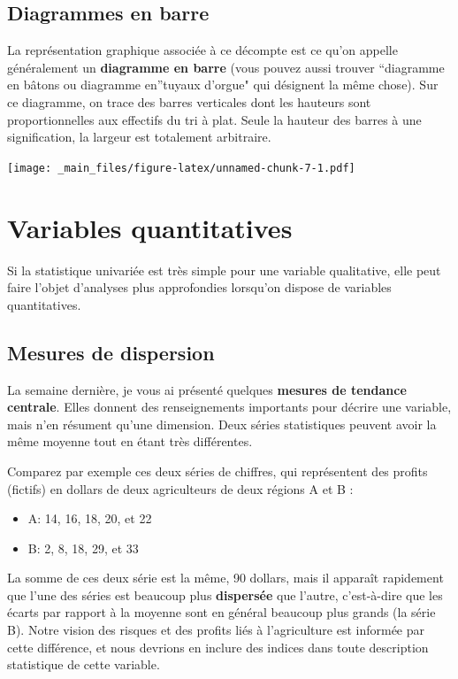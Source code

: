 \documentclass[
  french,
]{book}
\providecommand{\tightlist}{%
  \setlength{\itemsep}{0pt}\setlength{\parskip}{0pt}}
\begin{document}
\hypertarget{diagrammes-en-barre}{%
\subsection{Diagrammes en barre}\label{diagrammes-en-barre}}

La représentation graphique associée à ce décompte est ce qu'on appelle généralement un \textbf{diagramme en barre} (vous pouvez aussi trouver ``diagramme en bâtons ou diagramme en''tuyaux d'orgue" qui désignent la même chose). Sur ce diagramme, on trace des barres verticales dont les hauteurs sont proportionnelles aux effectifs du tri à plat. Seule la hauteur des barres à une signification, la largeur est totalement arbitraire.

\texttt{[image: \_main\_files/figure-latex/unnamed-chunk-7-1.pdf]}

\hypertarget{variables-quantitatives-1}{%
\section{Variables quantitatives}\label{variables-quantitatives-1}}

Si la statistique univariée est très simple pour une variable qualitative, elle peut faire l'objet d'analyses plus approfondies lorsqu'on dispose de variables quantitatives.

\hypertarget{mesures-de-dispersion}{%
\subsection{Mesures de dispersion}\label{mesures-de-dispersion}}

La semaine dernière, je vous ai présenté quelques \textbf{mesures de tendance centrale}. Elles donnent des renseignements importants pour décrire une variable, mais n'en résument qu'une dimension. Deux séries statistiques peuvent avoir la même moyenne tout en étant très différentes.

Comparez par exemple ces deux séries de chiffres, qui représentent des profits (fictifs) en dollars de deux agriculteurs de deux régions A et B :

\begin{itemize}
\tightlist
\item
  A: 14, 16, 18, 20, et 22
\item
  B: 2, 8, 18, 29, et 33
\end{itemize}

La somme de ces deux série est la même, 90 dollars, mais il apparaît rapidement que l'une des séries est beaucoup plus \textbf{dispersée} que l'autre, c'est-à-dire que les écarts par rapport à la moyenne sont en général beaucoup plus grands (la série B). Notre vision des risques et des profits liés à l'agriculture est informée par cette différence, et nous devrions en inclure des indices dans toute description statistique de cette variable.
\end{document}
